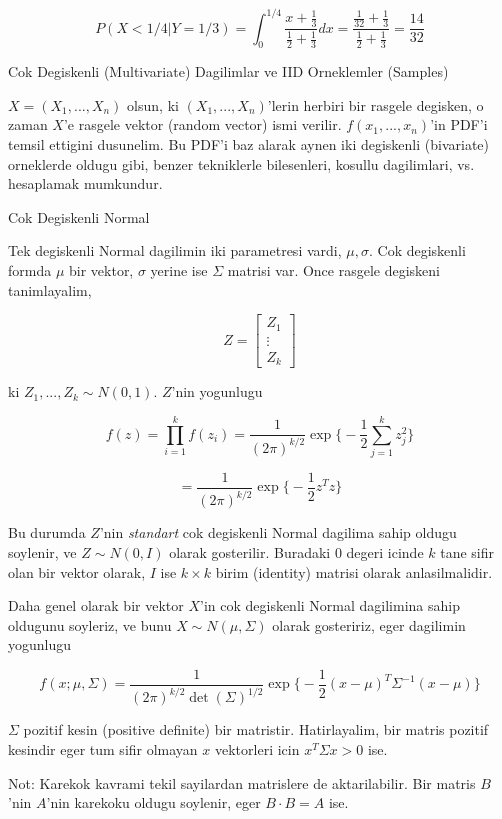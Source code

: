 \documentclass[12pt,fleqn]{article}\usepackage{../common}
\begin{document}
\[ P(X < 1/4 | Y = 1/3) = 
\int _{ 0}^{1/4} \frac{ x+ \frac{ 1}{3} }{\frac{ 1}{2} + \frac{1 }{3}} dx = 
\frac{ \frac{ 1}{32}+ \frac{ 1}{3} }{\frac{ 1}{2} + \frac{1 }{3}} = 
\frac{ 14}{32}
\]

Cok Degiskenli (Multivariate) Dagilimlar ve IID Orneklemler (Samples)

$X = (X_1,...,X_n)$ olsun, ki $(X_1,...,X_n)$'lerin herbiri bir rasgele
degisken, o zaman $X$'e rasgele vektor (random vector) ismi
verilir. $f(x_1,...,x_n)$'in PDF'i temsil ettigini dusunelim. Bu PDF'i baz
alarak aynen iki degiskenli (bivariate) orneklerde oldugu gibi, benzer
tekniklerle bilesenleri, kosullu dagilimlari, vs. hesaplamak mumkundur.

Cok Degiskenli Normal 

Tek degiskenli Normal dagilimin iki parametresi vardi, $\mu,\sigma$. Cok
degiskenli formda $\mu$ bir vektor, $\sigma$ yerine ise $\Sigma$ matrisi
var. Once rasgele degiskeni tanimlayalim,

\[ Z = 
\left[\begin{array}{r}
Z_1 \\ \vdots \\ Z_k
\end{array}\right]
 \]

ki $Z_1,...,Z_k \sim N(0,1)$. $Z$'nin yogunlugu 

\[ f(z) = \prod _{ i=1}^{k}f(z_i) = 
\frac{ 1}{(2\pi)^{k/2}} \exp 
\bigg\{ 
-\frac{ 1}{2}\sum _{ j=1}^{k}z_j^2
\bigg\}
 \]

\[ =
\frac{ 1}{(2\pi)^{k/2}} \exp 
\bigg\{ 
-\frac{ 1}{2}z^Tz
\bigg\}
 \]


Bu durumda $Z$'nin {\em standart} cok degiskenli Normal dagilima sahip
oldugu soylenir, ve $Z \sim N(0,I)$ olarak gosterilir. Buradaki $0$
degeri icinde $k$ tane sifir olan bir vektor olarak, $I$ ise $k \times k$
birim (identity) matrisi olarak anlasilmalidir. 

Daha genel olarak bir vektor $X$'in cok degiskenli Normal dagilimina sahip
oldugunu soyleriz, ve bunu $X \sim N(\mu,\Sigma)$ olarak gosteririz, eger
dagilimin yogunlugu 

\[ f(x;\mu,\Sigma) = 
\frac{ 1}{(2\pi)^{k/2} \det(\Sigma)^{1/2}} \exp 
\bigg\{ 
-\frac{ 1}{2}(x-\mu)^T\Sigma^{-1}(x-\mu)
\bigg\}
 \]

$\Sigma$ pozitif kesin (positive definite) bir matristir. Hatirlayalim, bir matris
pozitif kesindir eger tum sifir olmayan $x$ vektorleri icin $x^T\Sigma x >
0$ ise. 

Not: Karekok kavrami tekil sayilardan matrislere de aktarilabilir. Bir
matris $B$'nin $A$'nin karekoku oldugu soylenir, eger $B \cdot B = A$ ise.
\end{document}
